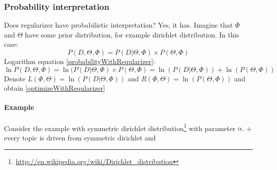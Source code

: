 	\subsubsection{Probability interpretation}
	    Does regularizer have probabilistic interpretation? Yes, it has. Imagine that $\Phi$ and $\Theta$ have some prior distribution, for example
	    dirichlet distribution. In this case:
	    \begin{equation} \label{probabilityWithReqularizer} P(D, \Theta, \Phi) = P(D| \Theta, \Phi) \times P(\Theta, \Phi) \end{equation}
	    Logarithm equation \ref{probabilityWithReqularizer}:
	    \begin{equation} \ln P(D, \Theta, \Phi) = \ln(P(D| \Theta, \Phi) \times P(\Theta, \Phi) = \ln(P(D| \Theta, \Phi)) + \ln(P(\Theta, \Phi)) \end{equation}
	    Denote $L(\Phi, \Theta) = \ln(P(D| \Theta, \Phi))$ and $R(\Phi, \Theta) = \ln(P(\Theta, \Phi))$ and obtain \ref{optimizeWithReqularizer}

	    \paragraph{Example}
		Consider the example with symmetric dirichlet distribution\footnote{\url{http://en.wikipedia.org/wiki/Dirichlet_distribution}} with parameter $\alpha$.
		+  every topic is driven from symmetric dirichlet and
		
		
